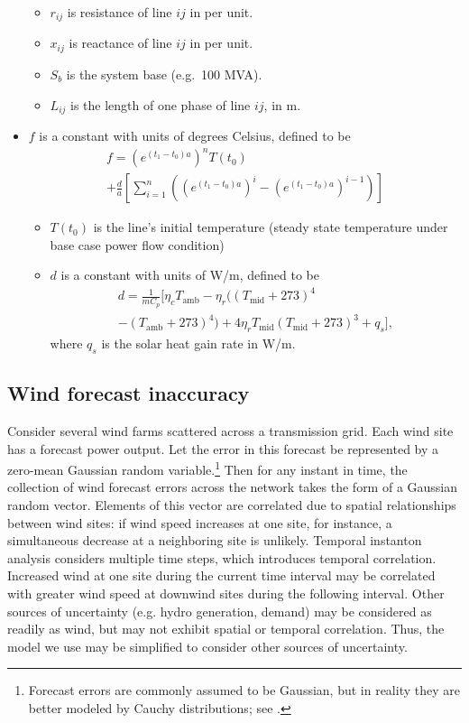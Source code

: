 \documentclass[conference]{IEEEtran}
\begin{document}
\begin{itemize}
  \begin{itemize}
  \itemsep1pt\parskip0pt
  \item
    $r_{ij}$ is resistance of line $ij$ in per unit.
  \item
    $x_{ij}$ is reactance of line $ij$ in per unit.
  \item
    $S_b$ is the system base (e.g.~100 MVA).
  \item
    $L_{ij}$ is the length of one phase of line $ij$, in m.
  \end{itemize}
\item $f$ is a constant with units of degrees Celsius, defined to be
	\begin{multline*}
		f = (e^{(t_1 - t_0)a})^n T(t_0) \\ + \frac{d}{a}\left[ \sum_{i=1}^n \left( (e^{(t_1-t_0)a})^i - (e^{(t_1-t_0)a})^{i-1} \right)\right]
	\end{multline*}
  \begin{itemize}
  \itemsep1pt\parskip0pt
  \item
    $T(t_0)$ is the line's initial temperature (steady state temperature
    under base case power flow condition)
  \item $d$ is a constant with units of W/m, defined to be 
  	\begin{multline*}
  	d = \frac{1}{mC_p}\big[ \eta_cT_\text{amb} - \eta_r\big((T_\text{mid} + 273)^4 \\ - (T_\text{amb} + 273)^4\big) + 4\eta_rT_\text{mid}(T_\text{mid} + 273)^3 + q_s \big],
  	\end{multline*}
      where $q_s$ is the solar heat gain rate in W/m.
  \end{itemize}
\end{itemize}

\subsection{Wind forecast inaccuracy}

Consider several wind farms scattered across a transmission grid. Each wind site has a forecast power output. Let the error in this forecast be represented by a zero-mean Gaussian random variable.\footnote{Forecast errors are commonly assumed to be Gaussian, but in reality they are better modeled by Cauchy distributions; see \cite{hodge2011}.} Then for any instant in time, the collection of wind forecast errors across the network takes the form of a Gaussian random vector. Elements of this vector are correlated due to spatial relationships between wind sites: if wind speed increases at one site, for instance, a simultaneous decrease at a neighboring site is unlikely. Temporal instanton analysis considers multiple time steps, which introduces temporal correlation. Increased wind at one site during the current time interval may be correlated with greater wind speed at downwind sites during the following interval. Other sources of uncertainty (e.g. hydro generation, demand) may be considered as readily as wind, but may not exhibit spatial or temporal correlation. Thus, the model we use may be simplified to consider other sources of uncertainty.
\end{document}
